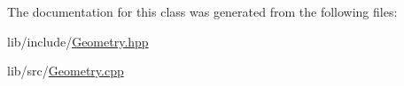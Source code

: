 The documentation for this class was generated from the following files\-:\begin{DoxyCompactItemize}
\item 
lib/include/\hyperlink{Geometry_8hpp}{Geometry.\-hpp}\item 
lib/src/\hyperlink{Geometry_8cpp}{Geometry.\-cpp}\end{DoxyCompactItemize}
